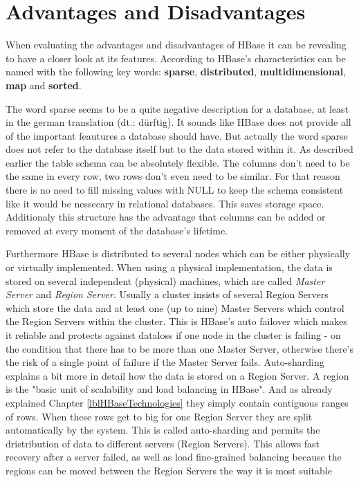 
\section{Advantages and Disadvantages}
When evaluating the advantages and disadvantages of HBase it can be revealing to have a closer look at its features. According to \cite{hbase.achari.2015} HBase's characteristics can be named with the following key words: \textbf{sparse}, \textbf{distributed}, \textbf{multidimensional}, \textbf{map} and \textbf{sorted}. 

The word sparse seems to be a quite negative description for a database, at least in the german translation (dt.: dürftig). It sounds like HBase does not provide all of the important feautures a database should have. But actually the word sparse does not refer to the database itself but to the data stored within it. As described earlier the table schema can be absolutely flexible. The columns don't need to be the same in every row, two rows don't even need to be similar. For that reason there is no need to fill missing values with NULL to keep the schema consistent like it would be nessecary in relational databases. This saves storage space. Additionaly this structure has the advantage that columns can be added or removed at every moment of the database's lifetime. \cite{hbase.achari.2015}

Furthermore HBase is distributed to several nodes which can be either physically or virtually implemented. When using a physical implementation, the data is stored on several independent (physical) machines, \cite{hbase.wilson.2008} which are called \textit{Master Server} and \textit{Region Server}. Usually a cluster insists of several Region Servers which store the data \cite{hbase.vohra.2016} and at least one (up to nine) Master Servers which control the Region Servers within the cluster. \cite{hbase.apache.foundation.2017} This is HBase's auto failover which makes it reliable and protects against dataloss if one node in the cluster is failing \cite{hbase.wilson.2008} - on the condition that there has to be more than one Master Server, otherwise there’s the risk of a single point of failure if the Master Server fails. \cite{hbase.shriparv.2014}
Auto-sharding explains a bit more in detail how the data is stored on a Region Server. A region is the "basic unit of scalability and load balancing in HBase". And as already explained Chapter \ref{lblHBaseTechnologies} they simply contain contiguous ranges of rows. When these rows get to big for one Region Server they are split automatically by the system. This is called auto-sharding and permits the dristribution of data to different servers (Region Servers). This allows fast recovery after a server failed, as well as load fine-grained balancing because the regions can be moved between the Region Servers the way it is most suitable \cite{hbase.george.2011}

